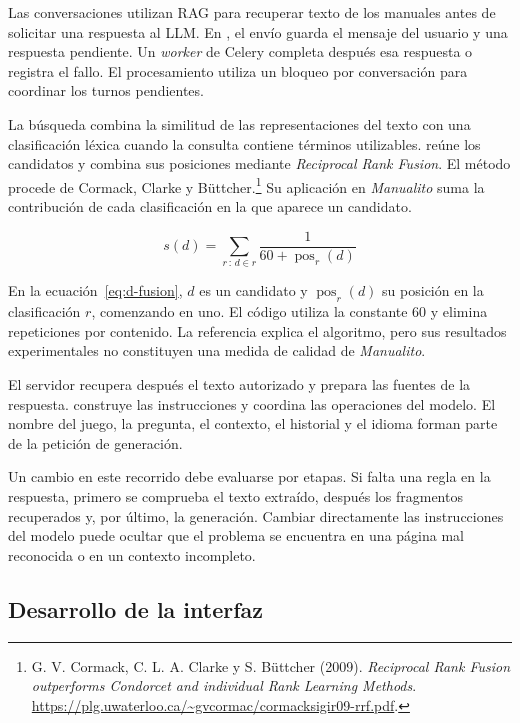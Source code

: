 Las conversaciones utilizan \ac{RAG} para recuperar texto de los manuales antes de solicitar una respuesta al \ac{LLM}. En , el envío guarda el mensaje del usuario y una respuesta pendiente. Un \textit{worker} de Celery completa después esa respuesta o registra el fallo. El procesamiento utiliza un bloqueo por conversación para coordinar los turnos pendientes.

La búsqueda combina la similitud de las representaciones del texto con una clasificación léxica cuando la consulta contiene términos utilizables.  reúne los candidatos y  combina sus posiciones mediante \emph{Reciprocal Rank Fusion}. El método procede de Cormack, Clarke y Büttcher.\footnote{G. V. Cormack, C. L. A. Clarke y S. Büttcher (2009). \emph{Reciprocal Rank Fusion outperforms Condorcet and individual Rank Learning Methods}. \url{https://plg.uwaterloo.ca/~gvcormac/cormacksigir09-rrf.pdf}.} Su aplicación en \textit{Manualito} suma la contribución de cada clasificación en la que aparece un candidato.

\begin{equation}
  s(d)=\sum_{r\, :\, d\in r}\frac{1}{60+\operatorname{pos}_{r}(d)}
  \label{eq:d-fusion}
\end{equation}

En la ecuación~\ref{eq:d-fusion}, $d$ es un candidato y $\operatorname{pos}_{r}(d)$ su posición en la clasificación $r$, comenzando en uno. El código utiliza la constante 60 y elimina repeticiones por contenido. La referencia explica el algoritmo, pero sus resultados experimentales no constituyen una medida de calidad de \textit{Manualito}.

El servidor recupera después el texto autorizado y prepara las fuentes de la respuesta.  construye las instrucciones y  coordina las operaciones del modelo. El nombre del juego, la pregunta, el contexto, el historial y el idioma forman parte de la petición de generación.

Un cambio en este recorrido debe evaluarse por etapas. Si falta una regla en la respuesta, primero se comprueba el texto extraído, después los fragmentos recuperados y, por último, la generación. Cambiar directamente las instrucciones del modelo puede ocultar que el problema se encuentra en una página mal reconocida o en un contexto incompleto.

\subsection{Desarrollo de la interfaz}


